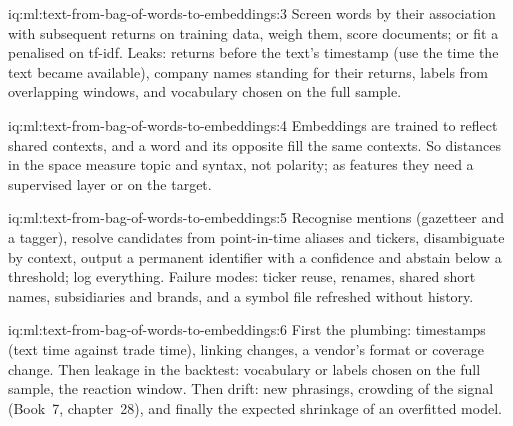\begin{solution}{iq:ml:text-from-bag-of-words-to-embeddings:3}
Screen words by their association with subsequent returns on training data, weigh them, score documents; or fit a
penalised  on tf-idf. Leaks: returns before the text's timestamp (use the time the text became
available), company names standing for their returns, labels from overlapping windows, and vocabulary chosen on the full
sample.
\end{solution}

\begin{solution}{iq:ml:text-from-bag-of-words-to-embeddings:4}
Embeddings are trained to reflect shared contexts, and a word and its opposite fill the same contexts. So distances in the
space measure topic and syntax, not polarity; as features they need a supervised layer or  on the target.
\end{solution}

\begin{solution}{iq:ml:text-from-bag-of-words-to-embeddings:5}
Recognise mentions (gazetteer and a tagger), resolve candidates from point-in-time aliases and tickers, disambiguate by
context, output a permanent identifier with a confidence and abstain below a threshold; log everything. Failure modes:
ticker reuse, renames, shared short names, subsidiaries and brands, and a symbol file refreshed without history.
\end{solution}

\begin{solution}{iq:ml:text-from-bag-of-words-to-embeddings:6}
First the plumbing: timestamps (text time against trade time), linking changes, a vendor's format or coverage change. Then
leakage in the backtest: vocabulary or labels chosen on the full sample, the reaction window. Then drift: new phrasings,
crowding of the signal (Book~7, chapter~28), and finally the expected shrinkage of an overfitted model.
\end{solution}
